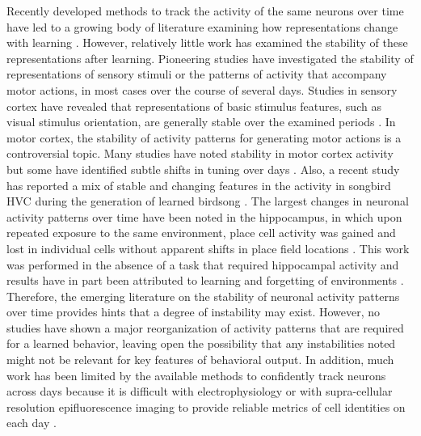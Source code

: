 Recently developed methods to track the activity of the same neurons over time have led to a growing body of literature examining how representations change with learning \citep{Huber2012, Komiyama2010, Peters2014, Poort2015}. However, relatively little work has examined the stability of these representations after learning. Pioneering studies have investigated the stability of representations of sensory stimuli or the patterns of activity that accompany motor actions, in most cases over the course of several days. Studies in sensory cortex have revealed that representations of basic stimulus features, such as visual stimulus orientation, are generally stable over the examined periods \citep{Tolias2007, Andermann2010, Mank2008, Margolis2012, Peron2015, Poort2015, Rose2016} . In motor cortex, the stability of activity patterns for generating motor actions is a controversial topic. Many studies have noted stability in motor cortex activity but some have identified subtle shifts in tuning over days \citep{Chestek2007, Ganguly2009, Huber2012, Peters2014, Padoa-Schioppa2004, Rokni2007a, Stevenson2011}. Also, a recent study has reported a mix of stable and changing features in the activity in songbird HVC during the generation of learned birdsong \citep{Liberti2016}. The largest changes in neuronal activity patterns over time have been noted in the hippocampus, in which upon repeated exposure to the same environment, place cell activity was gained and lost in individual cells without apparent shifts in place field locations \citep{Kentros2004, Ziv2013}. This work was performed in the absence of a task that required hippocampal activity and results have in part been attributed to learning and forgetting of environments \citep{Attardo2015, Ziv2013}. Therefore, the emerging literature on the stability of neuronal activity patterns over time provides hints that a degree of instability may exist. However, no studies have shown a major reorganization of activity patterns that are required for a learned behavior, leaving open the possibility that any instabilities noted might not be relevant for key features of behavioral output. In addition, much work has been limited by the available methods to confidently track neurons across days because it is difficult with electrophysiology or with supra-cellular resolution epifluorescence imaging to provide reliable metrics of cell identities on each day \citep{Peron2015a}.
